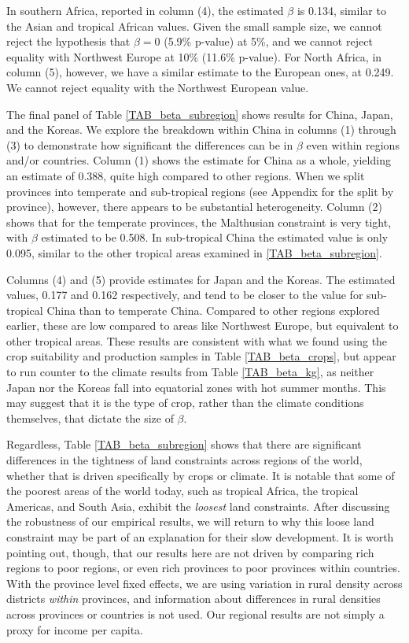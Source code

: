 \documentclass[11pt]{article}
\begin{document}
In southern Africa, reported in column (4), the estimated $\beta$ is 0.134, similar to the Asian and tropical African values. Given the small sample size, we cannot reject the hypothesis that $\beta=0$ (5.9\% p-value) at 5\%, and we cannot reject equality with Northwest Europe at 10\% (11.6\% p-value). For North Africa, in column (5), however, we have a similar estimate to the European ones, at 0.249. We cannot reject equality with the Northwest European value.

The final panel of Table \ref{TAB_beta_subregion} shows results for China, Japan, and the Koreas. We explore the breakdown within China in columns (1) through (3) to demonstrate how significant the differences can be in $\beta$ even within regions and/or countries. Column (1) shows the estimate for China as a whole, yielding an estimate of 0.388, quite high compared to other regions. When we split provinces into temperate and sub-tropical regions (see Appendix for the split by province), however, there appears to be substantial heterogeneity. Column (2) shows that for the temperate provinces, the Malthusian constraint is very tight, with $\beta$ estimated to be 0.508. In sub-tropical China the estimated value is only 0.095, similar to the other tropical areas examined in \ref{TAB_beta_subregion}.

Columns (4) and (5) provide estimates for Japan and the Koreas. The estimated values, 0.177 and 0.162 respectively, and tend to be closer to the value for sub-tropical China than to temperate China. Compared to other regions explored earlier, these are low compared to areas like Northwest Europe, but equivalent to other tropical areas. These results are consistent with what we found using the crop suitability and production samples in Table \ref{TAB_beta_crops}, but appear to run counter to the climate results from Table \ref{TAB_beta_kg}, as neither Japan nor the Koreas fall into equatorial zones with hot summer months. This may suggest that it is the type of crop, rather than the climate conditions themselves, that dictate the size of $\beta$.

Regardless, Table \ref{TAB_beta_subregion} shows that there are significant differences in the tightness of land constraints across regions of the world, whether that is driven specifically by crops or climate. It is notable that some of the poorest areas of the world today, such as tropical Africa, the tropical Americas, and South Asia, exhibit the \textit{loosest} land constraints. After discussing the robustness of our empirical results, we will return to why this loose land constraint may be part of an explanation for their slow development. It is worth pointing out, though, that our results here are not driven by comparing rich regions to poor regions, or even rich provinces to poor provinces within countries. With the province level fixed effects, we are using variation in rural density across districts \textit{within} provinces, and information about differences in rural densities across provinces or countries is not used. Our regional results are not simply a proxy for income per capita. 
\end{document}
